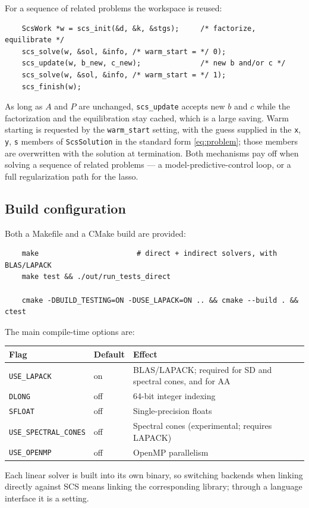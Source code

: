 \documentclass[11pt,a4paper]{article}
\theoremstyle{plain}
\begin{document}
For a sequence of related problems the workspace is reused:
\begin{verbatim}
    ScsWork *w = scs_init(&d, &k, &stgs);     /* factorize, equilibrate */
    scs_solve(w, &sol, &info, /* warm_start = */ 0);
    scs_update(w, b_new, c_new);              /* new b and/or c */
    scs_solve(w, &sol, &info, /* warm_start = */ 1);
    scs_finish(w);
\end{verbatim}
As long as $A$ and $P$ are unchanged, \texttt{scs\_update} accepts new $b$ and
$c$ while the factorization and the equilibration stay cached, which is a large
saving. Warm starting is requested by the \texttt{warm\_start} setting, with
the guess supplied in the \texttt{x}, \texttt{y}, \texttt{s} members of
\texttt{ScsSolution} in the standard form \eqref{eq:problem}; those members are
overwritten with the solution at termination. Both mechanisms pay off when
solving a sequence of related problems --- a model-predictive-control loop, or
a full regularization path for the lasso.

\subsection{Build configuration}

Both a Makefile and a CMake build are provided:
\begin{verbatim}
    make                       # direct + indirect solvers, with BLAS/LAPACK
    make test && ./out/run_tests_direct

    cmake -DBUILD_TESTING=ON -DUSE_LAPACK=ON .. && cmake --build . && ctest
\end{verbatim}
The main compile-time options are:
\begin{center}
\small
\begin{tabular}{@{}lll@{}}
\toprule
Flag & Default & Effect \\
\midrule
\texttt{USE\_LAPACK}          & on  & BLAS/LAPACK; required for SD and spectral cones, and for AA \\
\texttt{DLONG}                & off & 64-bit integer indexing \\
\texttt{SFLOAT}               & off & Single-precision floats \\
\texttt{USE\_SPECTRAL\_CONES} & off & Spectral cones (experimental; requires LAPACK) \\
\texttt{USE\_OPENMP}          & off & OpenMP parallelism \\
\bottomrule
\end{tabular}
\end{center}
Each linear
solver is built into its own binary, so switching backends when linking
directly against SCS means linking the corresponding library; through a
language interface it is a setting.
\end{document}
